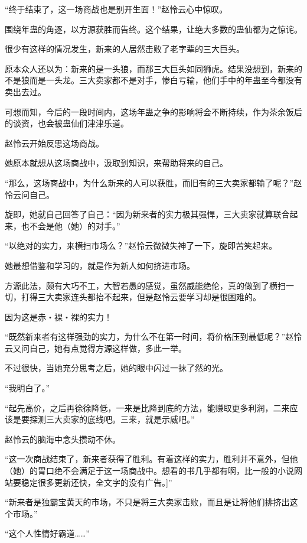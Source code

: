 
\begin{this_body}

“终于结束了，这一场商战也是别开生面！”赵怜云心中惊叹。

围绕年蛊的角逐，以方源获胜而告终。这个结果，让绝大多数的蛊仙都为之惊诧。

很少有这样的情况发生，新来的人居然击败了老字辈的三大巨头。

原本众人还以为：新来的是一头狼，而那三大巨头如同狮虎。结果没想到，新来的不是狼而是一头龙。三大卖家都不是对手，惨白亏输，他们手中的年蛊至今都没有卖出去过。

可想而知，今后的一段时间内，这场年蛊之争的影响将会不断持续，作为茶余饭后的谈资，也会被蛊仙们津津乐道。

赵怜云开始反思这场商战。

她原本就想从这场商战中，汲取到知识，来帮助将来的自己。

“那么，这场商战中，为什么新来的人可以获胜，而旧有的三大卖家都输了呢？”赵怜云问自己。

旋即，她就自己回答了自己：“因为新来者的实力极其强悍，三大卖家就算联合起来，也不会是他（她）的对手。”

“以绝对的实力，来横扫市场么？”赵怜云微微失神了一下，旋即苦笑起来。

她最想借鉴和学习的，就是作为新人如何挤进市场。

方源此法，颇有大巧不工，大智若愚的感觉，虽然威能绝伦，真的做到了横扫一切，打得三大卖家连头都抬不起来，但是赵怜云要学习却是很困难的。

因为这是赤・裸・裸的实力！

“既然新来者有这样强劲的实力，为什么不在第一时间，将价格压到最低呢？”赵怜云又问自己，她有点觉得方源这样做，多此一举。

不过很快，当她充分思考之后，她的眼中闪过一抹了然的光。

“我明白了。”

“起先高价，之后再徐徐降低，一来是比降到底的方法，能赚取更多利润，二来应该是要探测三大卖家的底线吧。三来，就是示威吧。”

赵怜云的脑海中念头攒动不休。

“这一次商战结束了，新来者获得了胜利。有着这样的实力，胜利并不意外，但他（她）的胃口绝不会满足于这一场商战中。想看的书几乎都有啊，比一般的小说网站要稳定很多更新还快，全文字的没有广告。]”

“新来者是独霸宝黄天的市场，不只是将三大卖家击败，而且是让将他们排挤出这个市场。”

“这个人性情好霸道……”


\end{this_body}
